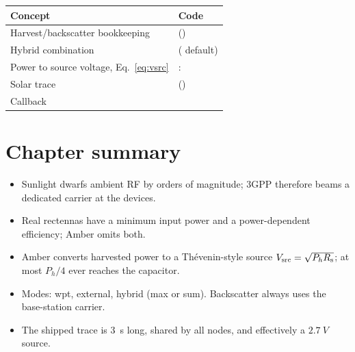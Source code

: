 \begin{codemap}
\small
\begin{tabularx}{\linewidth}{@{}>{\ttfamily}p{5.0cm}X@{}}
\toprule
\normalfont\bfseries Concept & \normalfont\bfseries Code\\
\midrule
Harvest/backscatter bookkeeping & \codew{CoverageMap.calculate_node_power} (\file{propagation.py})\\
Hybrid combination & \codew{combine_mode} (\code{"max"} default)\\
Power to source voltage, Eq.~\eqref{eq:vsrc} & \codew{Controller.run}: \codew{(power_w * R_series) ** 0.5}\\
Solar trace & \codew{EnvEnergySource} (\file{energy.py})\\
Callback & \codew{CoverageMap.node_ext_power_fn}\\
\bottomrule
\end{tabularx}
\end{codemap}

\section{Chapter summary}
\begin{itemize}
 \item Sunlight dwarfs ambient RF by orders of magnitude; 3GPP therefore beams a dedicated carrier at the devices.
 \item Real rectennas have a minimum input power and a power-dependent efficiency; Amber omits both.
 \item Amber converts harvested power to a Th\'evenin-style source $V_{\mathrm{src}}=\sqrt{P_hR_{\mathrm{s}}}$; at most $P_h/4$ ever reaches the capacitor.
 \item Modes: wpt, external, hybrid (max or sum). Backscatter always uses the base-station carrier.
 \item The shipped trace is $3$~s long, shared by all nodes, and effectively a $\SI{2.7}{V}$ source.
\end{itemize}

